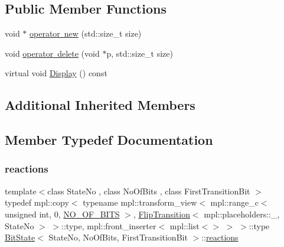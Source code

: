 \subsection*{Public Member Functions}
\begin{DoxyCompactItemize}
\item 
void $\ast$ \mbox{\hyperlink{struct_bit_state_aa7543c5a18aa027866b17e5fe389a413}{operator new}} (std\+::size\+\_\+t size)
\item 
void \mbox{\hyperlink{struct_bit_state_ac0109e89bbccfb21a812a92b239ebac2}{operator delete}} (void $\ast$p, std\+::size\+\_\+t size)
\item 
virtual void \mbox{\hyperlink{struct_bit_state_a3f26c599cf4a72a263d4fc2c2f7e693d}{Display}} () const
\end{DoxyCompactItemize}
\subsection*{Additional Inherited Members}


\subsection{Member Typedef Documentation}
\mbox{\label{struct_bit_state_a59bd125c7d205880081926b1a6d7689a}} 
\subsubsection{\texorpdfstring{reactions}{reactions}\hspace{0.1cm}{\footnotesize\ttfamily [1/2]}}
{\footnotesize\ttfamily template$<$class State\+No , class No\+Of\+Bits , class First\+Transition\+Bit $>$ \\
typedef mpl\+::copy$<$ typename mpl\+::transform\+\_\+view$<$ mpl\+::range\+\_\+c$<$ unsigned int, 0, \mbox{\hyperlink{_bit_machine_8cpp_ac894b74325002b036bfc596bd5434f89}{N\+O\+\_\+\+O\+F\+\_\+\+B\+I\+TS}} $>$, \mbox{\hyperlink{struct_flip_transition}{Flip\+Transition}}$<$ mpl\+::placeholders\+::\+\_\+, State\+No $>$ $>$\+::type, mpl\+::front\+\_\+inserter$<$ mpl\+::list$<$$>$ $>$ $>$\+::type \mbox{\hyperlink{struct_bit_state}{Bit\+State}}$<$ State\+No, No\+Of\+Bits, First\+Transition\+Bit $>$\+::\mbox{\hyperlink{struct_bit_state_a59bd125c7d205880081926b1a6d7689a}{reactions}}}

\mbox{\label{struct_bit_state_a409080fdeaba7f3ec0b63f44bc683d92}} 

